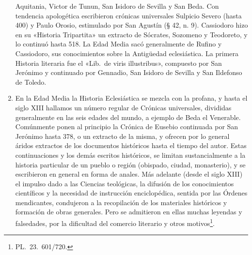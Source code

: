 \raggedbottom{} \documentclass[12pt, a4paper]{book}
\begin{document}
\begin{enumerate}
Aquitania, Victor de Tunun, San Isidoro de Sevilla y San Beda. Con tendencia apologética escribieron crónicas universales Sulpicio Severo (hasta 400) y Paulo Orosio, estimulado por San Agustín (§ 42, n. 9). Cassiodoro hizo en su «Historia Tripartita» un extracto de Sócrates, Sozomeno y Teodoreto, y lo continuó hasta 518. La Edad Media sacó generalmente de Rufino y Cassiodoro, sus conocimientos sobre la Antigüedad eclesiástica. La primera Historia literaria fue el «Lib.\ de viris illustribus», compuesto por San Jerónimo y continuado por Gennadio, San Isidoro de Sevilla y San Ildefonso de Toledo.
  \item En la Edad Media la Historia Eclesiástica se mezcla con la profana, y hasta el siglo XIII hallamos un número regular de Crónicas universales, divididas generalmente en las seis edades del mundo, a ejemplo de Beda el Venerable. Comúnmente ponen al principio la Crónica de Eusebio continuada por San Jerónimo hasta 378, o un extracto de la misma, y ofrecen por lo general áridos extractos de los documentos históricos hasta el tiempo del autor. Estas continuaciones y los demás escritos históricos, se limitan sustancialmente a la historia particular de un pueblo o región (obispado, ciudad, monasterio), y se escribieron en general en forma de anales. Más adelante (desde el siglo XIII) el impulso dado a las Ciencias teológicas, la difusión de los conocimientos científicos y la necesidad de instrucción enciclopédica, sentida por las Órdenes mendicantes, condujeron a la recopilación de los materiales históricos y formación de obras generales. Pero se admitieron en ellas muchas leyendas y falsedades, por la dificultad del comercio literario y otros motivos\footnote{PL.\ 23.\ 601/720.}.


\end{enumerate}
\end{document}
